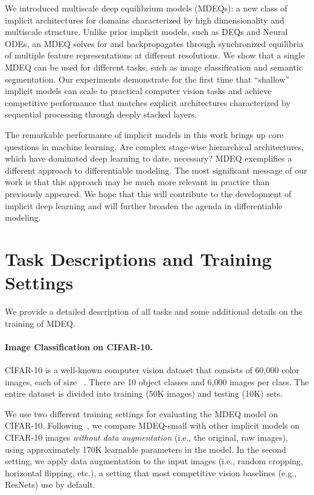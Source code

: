 \documentclass{article}
\begin{document}
We introduced multiscale deep equilibrium models (MDEQs): a new class of implicit architectures for domains characterized by high dimensionality and multiscale structure. Unlike prior implicit models, such as DEQs and Neural ODEs, an MDEQ solves for and backpropagates through synchronized equilibria of multiple feature representations at different resolutions. We show that a single MDEQ can be used for different tasks, such as image classification and semantic segmentation. Our experiments demonstrate for the first time that ``shallow'' implicit models can scale to practical computer vision tasks and achieve competitive performance that matches explicit architectures characterized by sequential processing through deeply stacked layers.

The remarkable performance of implicit models in this work brings up core questions in machine learning. Are complex stage-wise hierarchical architectures, which have dominated deep learning to date, necessary? MDEQ exemplifies a different approach to differentiable modeling. The most significant message of our work is that this approach may be much more relevant in practice than previously appeared. We hope that this will contribute to the development of implicit deep learning and will further broaden the agenda in differentiable modeling.





\appendix

\newpage

\section{Task Descriptions and Training Settings}

We provide a detailed description of all tasks and some additional details on the training of MDEQ.

\label{app:tasks}

\paragraph{Image Classification on CIFAR-10.} CIFAR-10 is a well-known computer vision dataset that consists of 60,000 color images, each of size ~\cite{krizhevsky2009learning}. There are 10 object classes and 6,000 images per class. The entire dataset is divided into training (50K images) and testing (10K) sets.

We use two different training settings for evaluating the MDEQ model on CIFAR-10. Following~\citet{dupont2019augmented}, we compare MDEQ-small with other implicit models on CIFAR-10 images \emph{without data augmentation} (i.e., the original, raw images), using approximately 170K learnable parameters in the model. In the second setting, we apply data augmentation to the input images (i.e., random cropping, horizontal flipping, etc.), a setting that most competitive vision baselines (e.g., ResNets) use by default.
\end{document}
